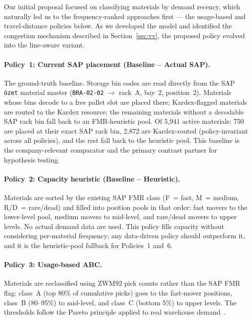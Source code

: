 Our initial proposal focused on classifying materials by demand recency,
which naturally led us to the frequency-ranked approaches first --- the
usage-based and travel-distance policies below. As we developed the model
and identified the congestion mechanism described in Section~\ref{sec:vv},
the proposed policy evolved into the line-aware variant.

\paragraph{Policy~1: Current SAP placement (Baseline -- Actual SAP).}
The ground-truth baseline. Storage bin codes are read directly from the SAP
\texttt{özet} material master (\texttt{BRA-02-02} $\to$ rack~A, bay~2,
position~2). Materials whose bins decode to a free pallet slot are placed
there; Kardex-flagged materials are routed to the Kardex resource; the
remaining materials without a decodable SAP rack bin fall back to an
FMR-heuristic pool. Of 5,941 active materials: 750 are placed at their
exact SAP rack bin, 2,872 are Kardex-routed (policy-invariant across all
policies), and the rest fall back to the heuristic pool. This baseline is
the company-relevant comparator and the primary contrast partner for
hypothesis testing.

\paragraph{Policy~2: Capacity heuristic (Baseline -- Heuristic).}
Materials are sorted by the existing SAP FMR class (F~= fast, M~= medium,
R/D~= rare/dead) and filled into position pools in that order: fast movers
to the lower-level pool, medium movers to mid-level, and rare/dead movers to
upper levels. No actual demand data are used. This policy fills capacity
without considering per-material frequency; any data-driven policy should
outperform it, and it is the heuristic-pool fallback for Policies~1 and~6.

\paragraph{Policy~3: Usage-based ABC.}
Materials are reclassified using ZWM92 pick counts rather than the SAP FMR
flag: class~A (top 80\% of cumulative picks) goes to the fast-mover
positions, class~B (80--95\%) to mid-level, and class~C (bottom 5\%) to
upper levels. The thresholds follow the Pareto principle
applied to real warehouse demand~\cite{frazelle2002, dekoster2007}.

